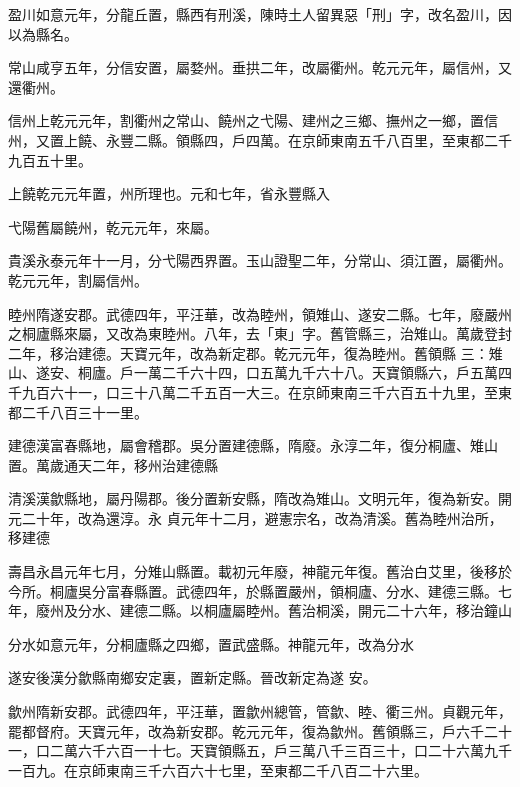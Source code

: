 \begin{pinyinscope}
 盈川如意元年，分龍丘置，縣西有刑溪，陳時土人留異惡「刑」字，改名盈川，因以為縣名。



 常山咸亨五年，分信安置，屬婺州。垂拱二年，改屬衢州。乾元元年，屬信州，又還衢州。



 信州上乾元元年，割衢州之常山、饒州之弋陽、建州之三鄉、撫州之一鄉，置信州，又置上饒、永豐二縣。領縣四，戶四萬。在京師東南五千八百里，至東都二千九百五十里。



 上饒乾元元年置，州所理也。元和七年，省永豐縣入



 弋陽舊屬饒州，乾元元年，來屬。



 貴溪永泰元年十一月，分弋陽西界置。玉山證聖二年，分常山、須江置，屬衢州。乾元元年，割屬信州。



 睦州隋遂安郡。武德四年，平汪華，改為睦州，領雉山、遂安二縣。七年，廢嚴州之桐廬縣來屬，又改為東睦州。八年，去「東」字。舊管縣三，治雉山。萬歲登封二年，移治建德。天寶元年，改為新定郡。乾元元年，復為睦州。舊領縣
 三：雉山、遂安、桐廬。戶一萬二千六十四，口五萬九千六十八。天寶領縣六，戶五萬四千九百六十一，口三十八萬二千五百一大三。在京師東南三千六百五十九里，至東都二千八百三十一里。



 建德漢富春縣地，屬會稽郡。吳分置建德縣，隋廢。永淳二年，復分桐廬、雉山置。萬歲通天二年，移州治建德縣



 清溪漢歙縣地，屬丹陽郡。後分置新安縣，隋改為雉山。文明元年，復為新安。開元二十年，改為還淳。永
 貞元年十二月，避憲宗名，改為清溪。舊為睦州治所，移建德



 壽昌永昌元年七月，分雉山縣置。載初元年廢，神龍元年復。舊治白艾里，後移於今所。桐廬吳分富春縣置。武德四年，於縣置嚴州，領桐廬、分水、建德三縣。七年，廢州及分水、建德二縣。以桐廬屬睦州。舊治桐溪，開元二十六年，移治鐘山



 分水如意元年，分桐廬縣之四鄉，置武盛縣。神龍元年，改為分水



 遂安後漢分歙縣南鄉安定裏，置新定縣。晉改新定為遂
 安。



 歙州隋新安郡。武德四年，平汪華，置歙州總管，管歙、睦、衢三州。貞觀元年，罷都督府。天寶元年，改為新安郡。乾元元年，復為歙州。舊領縣三，戶六千二十一，口二萬六千六百一十七。天寶領縣五，戶三萬八千三百三十，口二十六萬九千一百九。在京師東南三千六百六十七里，至東都二千八百二十六里。




\end{pinyinscope}
